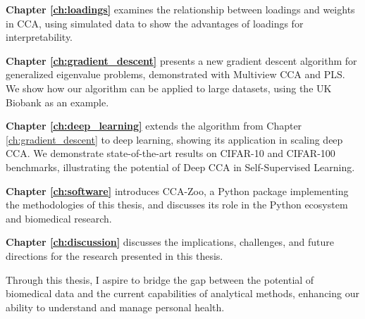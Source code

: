 \textbf{Chapter \ref{ch:loadings}} examines the relationship between loadings and weights in CCA, using simulated data to show the advantages of loadings for interpretability.

\textbf{Chapter \ref{ch:gradient_descent}} presents a new gradient descent algorithm for generalized eigenvalue problems, demonstrated with Multiview CCA and PLS. We show how our algorithm can be applied to large datasets, using the UK Biobank as an example.

\textbf{Chapter \ref{ch:deep_learning}} extends the algorithm from Chapter \ref{ch:gradient_descent} to deep learning, showing its application in scaling deep CCA. We demonstrate state-of-the-art results on CIFAR-10 and CIFAR-100 benchmarks, illustrating the potential of Deep CCA in Self-Supervised Learning.

\textbf{Chapter \ref{ch:software}} introduces CCA-Zoo, a Python package implementing the methodologies of this thesis, and discusses its role in the Python ecosystem and biomedical research.

\textbf{Chapter \ref{ch:discussion}} discusses the implications, challenges, and future directions for the research presented in this thesis.

Through this thesis, I aspire to bridge the gap between the potential of biomedical data and the current capabilities of analytical methods, enhancing our ability to understand and manage personal health.
